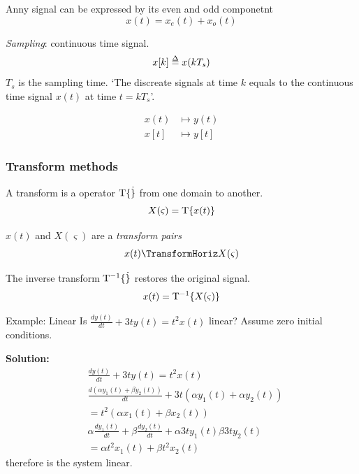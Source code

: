 \begin{multicols}{2}
Anny signal can be expressed by its even and odd componetnt
\begin{equation}
    x(t) = x_e(t) + x_o(t)
\end{equation}

\textit{Sampling}: continuous time signal.
\begin{equation}
    x[k] \delequal x(k T_s)
\end{equation}
$T_s$ is the sampling time.
`The discreate signals at time $k$ equals to 
the continuous time signal $x(t)$ at time $t = kT_s$'.

\begin{align}
    x(t)  &\mapsto y(t)    \\
    x[t]  &\mapsto y[t]
\end{align}


\subsubsection{Transform methods}
A transform is a operator $\mathrm{T}\{ \dot \}$ from one domain to another.
\begin{equation*}
    X(\varsigma) = \mathrm{T}\{ x(t) \}
\end{equation*}

$x(t)$ and $X(\varsigma)$ are a \textit{transform pairs}
\begin{equation*}
    x(t) \TransformHoriz X(\varsigma)
\end{equation*}

The inverse transform $\mathrm{T}^{-1}\{ \dot \}$ restores the original signal.
\begin{equation*}
    x(t) = \mathrm{T}^{-1}\{ X(\varsigma) \}
\end{equation*}

\begin{exampleblock}{Example: Linear}
Is $\frac{dy(t)}{dt}+3ty(t)=t^2x(t)$ linear? Assume zero initial conditions.

\textbf{Solution:}
\begin{align*}
    &\frac{dy(t)}{dt}+3ty(t) = t^2x(t) \\
    &\frac{d(\alpha y_1(t) + \beta y_2(t))}{dt} + 3t(\alpha y_1(t) + \alpha y_2(t)) \\ 
    &= t^2(\alpha x_1(t) + \beta x_2(t)) \\
    &\alpha\frac{dy_1(t)}{dt} + \beta\frac{dy_2(t)}{dt} + \alpha 3ty_1(t) \beta 3ty_2(t) \\
    &= \alpha t^2 x_1(t) + \beta t^2 x_2(t)
\end{align*}
therefore is the system linear.
\end{exampleblock}



\end{multicols}
